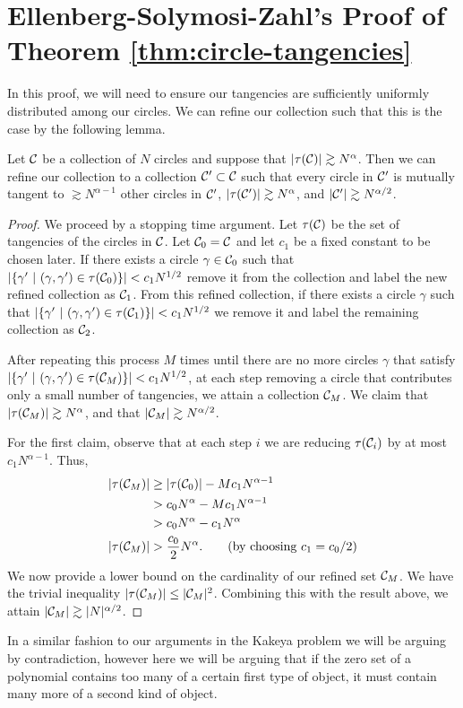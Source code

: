 \section[Ellenberg-Solymosi-Zahl's Proof]{Ellenberg-Solymosi-Zahl's Proof of Theorem \ref{thm:circle-tangencies}}
In this proof, we will need to ensure our tangencies
are sufficiently uniformly distributed among our circles. We can refine our collection such that this is the case by the following lemma.

\begin{lemma}
    Let $\mathcal C$ be a collection of $N$ circles and suppose that $|\tau(\mathcal C)| \gtrsim N^{\alpha}$. 
    Then we can refine our collection to a collection $\mathcal C' \subset \mathcal C$ such that every circle in $\mathcal C'$ is mutually tangent to $\gtrsim N^{\alpha -1}$ other circles in $\mathcal C'$, $|\tau(\mathcal C')| \gtrsim N^{\alpha}$, and $|\mathcal C'| \gtrsim N^{\alpha/2}$. \label{lem:uniform-refine}
\end{lemma}

\begin{proof}
We proceed by a stopping time argument.
Let $\tau(\mathcal C)$ be the set of tangencies of the circles in $\mathcal C$. Let $\mathcal C_0 = \mathcal C$ and let $c_1$ be a fixed constant to be chosen later. If there exists a circle $\gamma \in \mathcal C_0$ such that $|\{ \gamma' \ |\ (\gamma, \gamma') \in \tau(\mathcal C_0)\}| < c_1 N^{1/2}$
remove it from the collection and label the new refined collection as $\mathcal C_1$. From this refined collection, if there exists a circle $\gamma$ such that $|\{\gamma'\ |\ (\gamma, \gamma') \in \tau(\mathcal C_1)\}| < c_1 N^{1/2}$ we remove it and label the remaining collection as $\mathcal C_2$.

After repeating this process $M$ times until there are no more circles $\gamma$ that satisfy $|\{\gamma'\ |\ (\gamma, \gamma') \in \tau(\mathcal C_M)\}| < c_1 N^{1/2}$, at each step removing a circle that contributes only a small number of tangencies, we attain a collection $\mathcal C_M$.
 We claim that $|\tau(\mathcal C_M)| \gtrsim N^{\alpha}$, and that $|\mathcal C_M| \gtrsim N^{\alpha/2}$.

For the first claim, observe that at each step $i$ we are reducing $\tau(\mathcal C_i)$ by at most $c_1 N^{\alpha -1}$.  Thus,
\begin{align*}
    |\tau(\mathcal C_M)| &\geq |\tau(\mathcal C_0)| - M c_1 N^{\alpha -1} \\
    &> c_0 N^{\alpha} -  M c_1 N^{\alpha -1} \\ 
    &> c_0 N^{\alpha} - c_1 N^{\alpha} \\
    |\tau(\mathcal C_M)| &> \frac{c_0}{2} N^{\alpha}. \qquad (\text{by choosing } c_1 = c_0/2 )
\end{align*}
We now provide a lower bound on the cardinality of our refined set $\mathcal C_M$. We have the trivial inequality $|\tau(\mathcal C_M)| \leq |\mathcal C_M|^{2}$. 
Combining this with the result above, we attain $|\mathcal C_M| \gtrsim |N|^{\alpha/2}$.
\end{proof}
In a similar fashion to our arguments in the Kakeya problem we will be arguing by contradiction, however here we will be arguing that if the zero set of a polynomial contains too many of a certain first type of object, 
it must contain many more of a second kind of object. 




